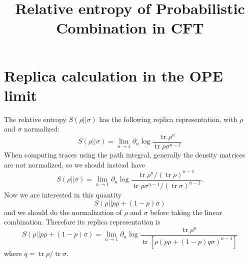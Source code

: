 \documentclass{article}
\title{Relative entropy of Probabilistic Combination in CFT}
\author{}
\theoremstyle{plain}
\theoremstyle{definition}
\theoremstyle{plain}
\def\tr{\operatorname{tr}}
\begin{document}
\maketitle

\section{Replica calculation in the OPE limit}
The relative entropy $S(\rho||\sigma)$ has the following replica representation, with $\rho$ and $\sigma$ normalized:
\begin{equation}
    S(\rho||\sigma)=\lim_{n\to 1}\partial_n \log \frac{\tr \rho^n}{\tr \rho \sigma^{n-1}} 
\end{equation}
When computing traces using the path integral, generally the density matrices are not normalized, so we should instead have
\begin{equation}
    S(\rho||\sigma)=\lim_{n\to 1}\partial_n \log \frac{\tr \rho^n/(\tr \rho)^{n-1}}{\tr \rho \sigma^{n-1}/(\tr \sigma)^{n-1}}.
\end{equation}
Now we are interested in this quantity
\begin{equation}
    S(\rho||p \rho +(1-p)\sigma)
\end{equation}
and we should do the normalization of $\rho$ and $\sigma$ before taking the linear combination. Therefore its replica representation is
\begin{equation}
    S(\rho||p \rho +(1-p)\sigma)=\lim_{n\to 1}\partial_n \log \frac{\tr \rho ^n}{\tr[\rho(p\rho +(1-p)q\sigma )^{n-1}]} 
\end{equation}
where $q=\tr \rho/\tr \sigma$.
\end{document}
